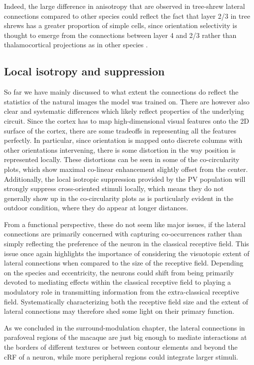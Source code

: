 Indeed, the large difference in anisotropy that are observed in
tree-shrew lateral connections compared to other species could reflect
the fact that layer 2/3 in tree shrews has a greater proportion of
simple cells, since orientation selectivity is thought to emerge from
the connections between layer 4 and 2/3 rather than thalamocortical
projections as in other species \citep{VanHooser2013}.

\subsection{Local isotropy and suppression}

So far we have mainly discussed to what extent the connections do
reflect the statistics of the natural images the model was trained
on. There are however also clear and systematic differences which
likely reflect properties of the underlying circuit. Since the cortex
has to map high-dimensional visual features onto the 2D surface of the
cortex, there are some tradeoffs in representing all the features
perfectly. In particular, since orientation is mapped onto discrete
columns with other orientations intervening, there is some distortion
in the way position is represented locally.  These distortions can be
seen in some of the co-circularity plots, which show maximal co-linear
enhancement slightly offset from the center. Additionally, the local
isotropic suppression provided by the PV population will strongly
suppress cross-oriented stimuli locally, which means they do not
generally show up in the co-circularity plots as is particularly
evident in the outdoor condition, where they do appear at longer
distances.

From a functional perspective, these do not seem like major issues,
if the lateral connections are primarily concerned
with capturing co-occurrences rather than simply reflecting the
preference of the neuron in the classical receptive field. This issue once
again highlights the importance of considering the visuotopic extent of
lateral connections when compared to the size of the receptive
field. Depending on the species and eccentricity, the neurons could
shift from being primarily devoted to mediating effects within the
classical receptive field to playing a modulatory role in transmitting
information from the extra-classical receptive field. Systematically
characterizing both the receptive field size and the extent of lateral
connections may therefore shed some light on their primary function.

As we concluded in the surround-modulation chapter, the lateral
connections in parafoveal regions of the macaque are just big enough
to mediate interactions at the borders of different textures or
between contour elements and beyond the cRF of a neuron, while more
peripheral regions could integrate larger stimuli.

